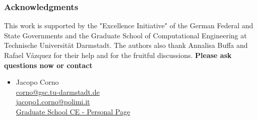 \documentclass[british,xcolor={dvipsnames},9pt]{beamer}
\begin{document}
\begin{frame}
	\frametitle{Acknowledgments}
	This work is supported by the "Excellence Initiative" of the German Federal and State Governments and the Graduate School of Computational Engineering at Technische Universit\"at Darmstadt.
	\vspace{.75cm}
	The authors also thank Annalisa Buffa and Rafael V\'azquez for their help and for the fruitful discussions.
	\vspace{.5cm}
	{\bf Please ask questions now or contact}\\
	\begin{itemize}
		\item[] Jacopo Corno\\
				\href{mailto:corno@gsc.tu-darmstadt.de}{corno@gsc.tu-darmstadt.de}\\
				\href{mailto:jacopo1.corno@polimi.it}{jacopo1.corno@polimi.it}\\[.5em]
				\href{http://www.graduate-school-ce.de/index.php?id=619}
{Graduate School CE - Personal Page}\\
	\end{itemize}
\end{frame}
\end{document}
